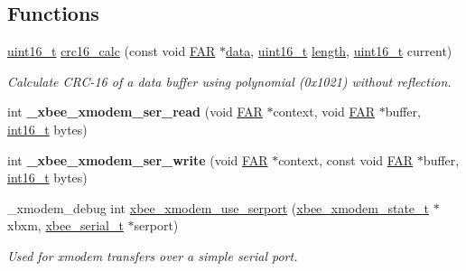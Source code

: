\subsection*{Functions}
\begin{DoxyCompactItemize}
\item 
\hyperlink{group__hal__dos_ga5a8b2dc9e45a9ee81a94ef304fb62505}{uint16\+\_\+t} \hyperlink{group__util__xmodem_ga48b65051c5461be6d016802e2eb8a138}{crc16\+\_\+calc} (const void \hyperlink{group__hal_gaef060b3456fdcc093a7210a762d5f2ed}{F\+AR} $\ast$\hyperlink{group__xbee__io_gac5955aa1e44ff234e6d78a19cf68f25c}{data}, \hyperlink{group__hal__dos_ga5a8b2dc9e45a9ee81a94ef304fb62505}{uint16\+\_\+t} \hyperlink{group__zdo_gab2b3adeb2a67e656ff030b56727fd0ac}{length}, \hyperlink{group__hal__dos_ga5a8b2dc9e45a9ee81a94ef304fb62505}{uint16\+\_\+t} current)
\begin{DoxyCompactList}\small\item\em Calculate C\+R\+C-\/16 of a data buffer using polynomial (0x1021) without reflection. \end{DoxyCompactList}\item 
\mbox{\label{group__util__xmodem_gae12995a59299dd50542d7a9eb6ddfd2c}} 
int {\bfseries \+\_\+xbee\+\_\+xmodem\+\_\+ser\+\_\+read} (void \hyperlink{group__hal_gaef060b3456fdcc093a7210a762d5f2ed}{F\+AR} $\ast$context, void \hyperlink{group__hal_gaef060b3456fdcc093a7210a762d5f2ed}{F\+AR} $\ast$buffer, \hyperlink{group__hal__dos_ga2140805d08462d474b82ddc8d1c2f3e6}{int16\+\_\+t} bytes)
\item 
\mbox{\label{group__util__xmodem_ga913fe444bce75fa12169083fbbf9ef03}} 
int {\bfseries \+\_\+xbee\+\_\+xmodem\+\_\+ser\+\_\+write} (void \hyperlink{group__hal_gaef060b3456fdcc093a7210a762d5f2ed}{F\+AR} $\ast$context, const void \hyperlink{group__hal_gaef060b3456fdcc093a7210a762d5f2ed}{F\+AR} $\ast$buffer, \hyperlink{group__hal__dos_ga2140805d08462d474b82ddc8d1c2f3e6}{int16\+\_\+t} bytes)
\item 
\+\_\+xmodem\+\_\+debug int \hyperlink{group__util__xmodem_ga728dd61f38b5563fe2ab45bcb982a1e7}{xbee\+\_\+xmodem\+\_\+use\+\_\+serport} (\hyperlink{structxbee__xmodem__state__t}{xbee\+\_\+xmodem\+\_\+state\+\_\+t} $\ast$xbxm, \hyperlink{structxbee__serial__t}{xbee\+\_\+serial\+\_\+t} $\ast$serport)
\begin{DoxyCompactList}\small\item\em Used for xmodem transfers over a simple serial port. \end{DoxyCompactList}\item 

\end{DoxyCompactItemize}
